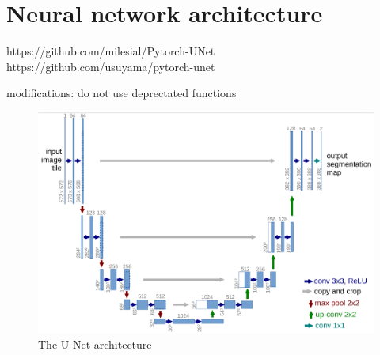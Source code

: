\section{Neural network architecture}


https://github.com/milesial/Pytorch-UNet
https://github.com/usuyama/pytorch-unet

modifications: do not use deprectated functions

\begin{figure}[H]
\centering
\includegraphics[width=14cm]{images/unet.png}
\caption{The U-Net architecture \cite{ronneberger2015u}}
\label{unet}
\end{figure}
